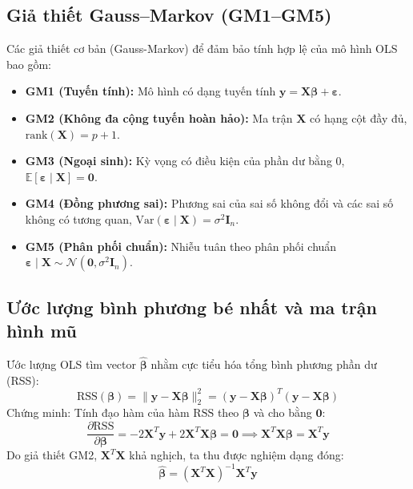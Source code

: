 \documentclass[12pt,a4paper]{article}
\begin{document}
\subsection{Giả thiết Gauss–Markov (GM1–GM5)}
Các giả thiết cơ bản (Gauss-Markov) để đảm bảo tính hợp lệ của mô hình OLS bao gồm:
\begin{itemize}
    \item \textbf{GM1 (Tuyến tính):} Mô hình có dạng tuyến tính $\mathbf{y} = \mathbf{X}\boldsymbol{\beta} + \boldsymbol{\varepsilon}$.
    \item \textbf{GM2 (Không đa cộng tuyến hoàn hảo):} Ma trận $\mathbf{X}$ có hạng cột đầy đủ, $\text{rank}(\mathbf{X}) = p + 1$.
    \item \textbf{GM3 (Ngoại sinh):} Kỳ vọng có điều kiện của phần dư bằng 0, $\mathbb{E}[\boldsymbol{\varepsilon} \mid \mathbf{X}] = \mathbf{0}$.
    \item \textbf{GM4 (Đồng phương sai):} Phương sai của sai số không đổi và các sai số không có tương quan, $\text{Var}(\boldsymbol{\varepsilon} \mid \mathbf{X}) = \sigma^2 \mathbf{I}_n$.
    \item \textbf{GM5 (Phân phối chuẩn):} Nhiễu tuân theo phân phối chuẩn $\boldsymbol{\varepsilon} \mid \mathbf{X} \sim \mathcal{N}(\mathbf{0}, \sigma^2 \mathbf{I}_n)$.
\end{itemize}

\subsection{Ước lượng bình phương bé nhất và ma trận hình mũ}
Ước lượng OLS tìm vector $\hat{\boldsymbol{\beta}}$ nhằm cực tiểu hóa tổng bình phương phần dư (RSS):
\begin{equation}
\text{RSS}(\boldsymbol{\beta}) = \|\mathbf{y} - \mathbf{X}\boldsymbol{\beta}\|_2^2 = (\mathbf{y} - \mathbf{X}\boldsymbol{\beta})^T(\mathbf{y} - \mathbf{X}\boldsymbol{\beta})
\end{equation}
Chứng minh: Tính đạo hàm của hàm $\text{RSS}$ theo $\boldsymbol{\beta}$ và cho bằng $\mathbf{0}$:
\begin{equation}
\frac{\partial \text{RSS}}{\partial \boldsymbol{\beta}} = -2\mathbf{X}^T\mathbf{y} + 2\mathbf{X}^T\mathbf{X}\boldsymbol{\beta} = \mathbf{0} \implies \mathbf{X}^T\mathbf{X}\boldsymbol{\beta} = \mathbf{X}^T\mathbf{y}
\end{equation}
Do giả thiết GM2, $\mathbf{X}^T\mathbf{X}$ khả nghịch, ta thu được nghiệm dạng đóng:
\begin{equation}
\hat{\boldsymbol{\beta}} = (\mathbf{X}^T\mathbf{X})^{-1}\mathbf{X}^T\mathbf{y}
\end{equation}
\end{document}
